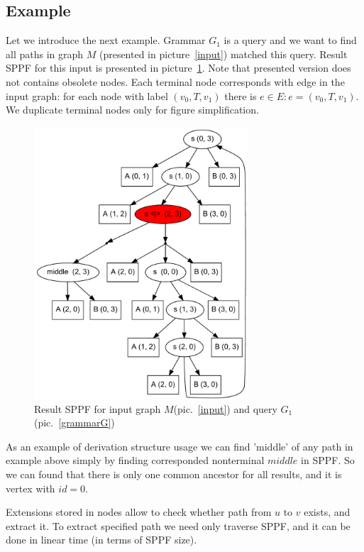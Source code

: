 \subsection{Example}

Let we introduce the next example. Grammar $G_1$ is a query and we want to find all paths in graph $M$ (presented in picture~\ref{input}) matched this query.
Result SPPF for this input is presented in picture~\ref{SPPF}. Note that presented version does not contains obsolete nodes.
Each terminal node corresponds with edge in the input graph: for each node with label $(v_0, T, v_1)$ there is $e\in E: e=(v_0,T,v_1)$.
We duplicate terminal nodes only for figure simplification.


\begin{figure}[h]
    \begin{center}
        \includegraphics[width=8cm]{dot/AnBn.pdf}
        \caption{Result SPPF for input graph $M$(pic.~\ref{input}) and query $G_1$(pic.~\ref{grammarG})}
        \label{SPPF}        
    \end{center}
\end{figure}

	
As an example of derivation structure usage we can find 'middle' of any path in example above simply by finding corresponded nonterminal $middle$ in SPPF.
So we can found that there is only one common ancestor for all results, and it is vertex with $id = 0$. 

Extensions stored in nodes allow to check whether path from $u$ to $v$ exists, and extract it. 
To extract specified path we need only traverse SPPF, and it can be done in linear time (in terms of SPPF size). 


